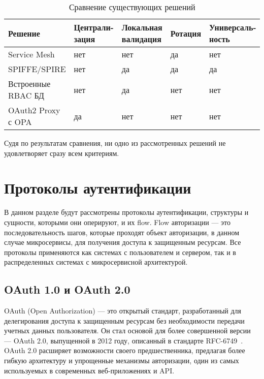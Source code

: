 \begin{table}[H]
\caption{Сравнение существующих решений}
\label{tabular:comparison}
\begin{tabular}{|p{3.5cm}|p{3cm}|p{2.5cm}|p{2cm}|p{3cm}|}
\hline
\textbf{Решение} & \textbf{Централи- зация} & \textbf{Локальная валидация} & \textbf{Ротация} & \textbf{Универсаль- ность}
\tabularnewline
\hline
Service Mesh & нет & нет & да & нет 
\tabularnewline
\hline
SPIFFE/SPIRE	 & нет & да & да & да
\tabularnewline
\hline
Встроенные RBAC БД & нет & да & нет & нет 
\tabularnewline
\hline
OAuth2 Proxy с OPA & да & нет & нет & нет
\tabularnewline
\hline

\end{tabular}
\end{table}

Судя по результатам сравнения, ни одно из рассмотренных решений не удовлетворяет сразу всем критериям.

\section{Протоколы аутентификации}
В данном разделе будут рассмотрены протоколы аутентификации, структуры и сущности, которыми они оперируют, и их flow. Flow авторизации --- это последовательность шагов, которые проходят объект авторизации, в данном случае микросервисы, для получения доступа к защищенным ресурсам.
Все протоколы применяются как системах с пользователем и сервером, так и в распределенных системах с микросервисной архитектурой.

\subsection{OAuth 1.0 и OAuth 2.0}
OAuth (Open Authorization) --- это открытый стандарт, разработанный для делегирования доступа к защищенным ресурсам без необходимости передачи учетных данных пользователя. Он стал основой для более совершенной версии — OAuth 2.0, выпущенной в 2012 году, описанный в стандарте RFC-6749~\cite{oauth2_spec}. OAuth 2.0 расширяет возможности своего предшественника, предлагая более гибкую архитектуру и упрощенные механизмы авторизации, один из самых используемых в современных веб-приложениях и API.~\cite{oauth2_artc}


